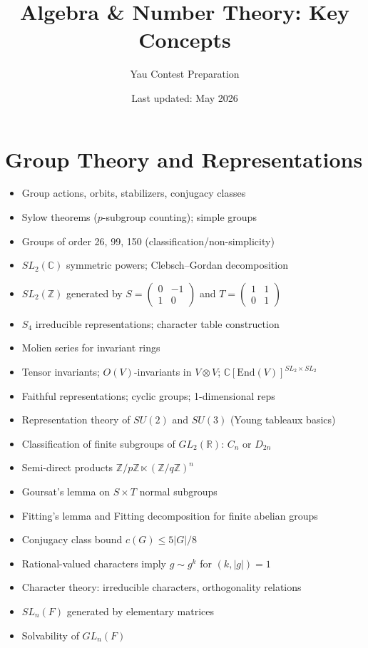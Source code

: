 \documentclass{amsart}
\title{Algebra \& Number Theory: Key Concepts}
\author{Yau Contest Preparation}
\date{Last updated: May 2026}
\begin{document}
\maketitle

\section{Group Theory and Representations}

\begin{itemize}
  \item Group actions, orbits, stabilizers, conjugacy classes
  \item Sylow theorems ($p$-subgroup counting); simple groups
  \item Groups of order 26, 99, 150 (classification/non-simplicity)
  \item $SL_2(\mathbb{C})$ symmetric powers; Clebsch--Gordan decomposition
  \item $SL_2(\mathbb{Z})$ generated by $S=\begin{pmatrix}0&-1\\1&0\end{pmatrix}$ and $T=\begin{pmatrix}1&1\\0&1\end{pmatrix}$
  \item $S_4$ irreducible representations; character table construction
  \item Molien series for invariant rings
  \item Tensor invariants; $O(V)$-invariants in $V\otimes V$; $\mathbb{C}[\mathrm{End}(V)]^{SL_2\times SL_2}$
  \item Faithful representations; cyclic groups; 1-dimensional reps
  \item Representation theory of $SU(2)$ and $SU(3)$ (Young tableaux basics)
  \item Classification of finite subgroups of $GL_2(\mathbb{R})$: $C_n$ or $D_{2n}$
  \item Semi-direct products $\mathbb{Z}/p\mathbb{Z} \ltimes (\mathbb{Z}/q\mathbb{Z})^n$
  \item Goursat's lemma on $S \times T$ normal subgroups
  \item Fitting's lemma and Fitting decomposition for finite abelian groups
  \item Conjugacy class bound $c(G) \leq 5|G|/8$
  \item Rational-valued characters imply $g \sim g^k$ for $(k,|g|)=1$
  \item Character theory: irreducible characters, orthogonality relations
  \item $SL_n(F)$ generated by elementary matrices
  \item Solvability of $GL_n(F)$
\end{itemize}
\end{document}
